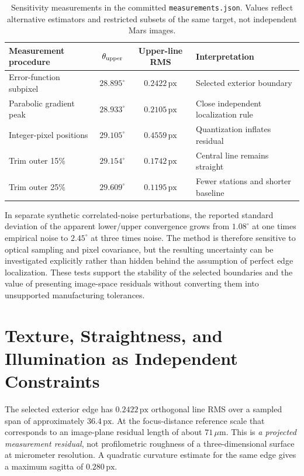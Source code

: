 \documentclass[11pt,letterpaper]{article}
\newcommand{\px}{\,\mathrm{px}}
\newcommand{\sourcepath}[1]{\nolinkurl{#1}}
\begin{document}
\begin{table}[ht]
\centering\small
\caption{Sensitivity measurements in the committed \sourcepath{measurements.json}. Values reflect alternative estimators and restricted subsets of the same target, not independent Mars images.}
\label{tab:sens}
\begin{tabularx}{\linewidth}{@{}l c c X@{}}
\toprule
\textbf{Measurement procedure} & \(\theta_{\rm upper}\) & \textbf{Upper-line RMS} & \textbf{Interpretation} \\
\midrule
Error-function subpixel & \(28.895^\circ\) & \(0.2422\px\) & Selected exterior boundary \\
Parabolic gradient peak & \(28.933^\circ\) & \(0.2105\px\) & Close independent localization rule \\
Integer-pixel positions & \(29.105^\circ\) & \(0.4559\px\) & Quantization inflates residual \\
Trim outer 15\% & \(29.154^\circ\) & \(0.1742\px\) & Central line remains straight \\
Trim outer 25\% & \(29.609^\circ\) & \(0.1195\px\) & Fewer stations and shorter baseline \\
\bottomrule
\end{tabularx}
\end{table}

In separate synthetic correlated-noise perturbations, the reported standard deviation of the apparent lower/upper convergence grows from \(1.08^\circ\) at one times empirical noise to \(2.45^\circ\) at three times noise. The method is therefore sensitive to optical sampling and pixel covariance, but the resulting uncertainty can be investigated explicitly rather than hidden behind the assumption of perfect edge localization. These tests support the stability of the selected boundaries and the value of presenting image-space residuals without converting them into unsupported manufacturing tolerances.

\section{Texture, Straightness, and Illumination as Independent Constraints}
\label{sec:comparisons}

The selected exterior edge has \(0.2422\px\) orthogonal line RMS over a sampled span of approximately \(36.4\px\). At the focus-distance reference scale that corresponds to an image-plane residual length of about \(71\,\mu\mathrm m\). This is \emph{a projected measurement residual}, not profilometric roughness of a three-dimensional surface at micrometer resolution. A quadratic curvature estimate for the same edge gives a maximum sagitta of \(0.280\px\).
\end{document}
